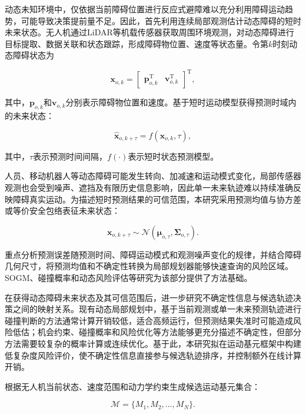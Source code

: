动态未知环境中，仅依据当前障碍位置进行反应式避障难以充分利用障碍运动趋势，可能导致决策提前量不足。因此，首先利用连续局部观测估计动态障碍的短时未来状态。无人机通过LiDAR等机载传感器获取周围环境观测，对动态障碍进行目标提取、数据关联和状态跟踪，形成障碍物位置、速度等状态量。令第$k$时刻动态障碍状态为

\begin{equation}
\mathbf{x}_{o,k}=\begin{bmatrix}\mathbf{p}_{o,k}^{\mathrm T} & \mathbf{v}_{o,k}^{\mathrm T}\end{bmatrix}^{\mathrm T},
\end{equation}

其中，$\mathbf{p}_{o,k}$和$\mathbf{v}_{o,k}$分别表示障碍物位置和速度。基于短时运动模型获得预测时域内的未来状态：

\begin{equation}
\hat{\mathbf{x}}_{o,k+\tau}=f(\mathbf{x}_{o,k},\tau),
\end{equation}

其中，$\tau$表示预测时间间隔，$f(\cdot)$表示短时状态预测模型。

人员、移动机器人等动态障碍可能发生转向、加减速和运动模式变化，局部传感器观测也会受到噪声、遮挡及有限历史信息影响，因此单一未来轨迹难以持续准确反映障碍真实运动。为描述短时预测结果的可信范围，本研究采用预测均值与协方差或等价安全包络表征未来状态：

\begin{equation}
\mathbf{x}_{o,k+\tau}\sim\mathcal{N}\left(\boldsymbol{\mu}_{o,\tau},\boldsymbol{\Sigma}_{o,\tau}\right).
\end{equation}

重点分析预测误差随预测时间、障碍运动模式和观测噪声变化的规律，并结合障碍几何尺寸，将预测均值和不确定性转换为局部规划器能够快速查询的风险区域。SOGM、碰撞概率和动态风险评估等研究为该部分提供了方法基础\cite{thomas2022sogm,thomas2023future,liu2023tight,xia2024risk}。

在获得动态障碍未来状态及其可信范围后，进一步研究不确定性信息与候选轨迹决策之间的映射关系。现有动态局部规划中，基于当前观测或单一未来预测轨迹进行碰撞判断的方法通常计算开销较低，适合高频运行，但预测结果失准时可能造成风险低估；机会约束、碰撞概率和风险优化等方法能够更充分描述不确定性，但部分方法需要较复杂的概率计算或连续优化。基于此，本研究拟在运动基元框架中构建低复杂度风险评价，使不确定性信息直接参与候选轨迹排序，并控制额外在线计算开销。

根据无人机当前状态、速度范围和动力学约束生成候选运动基元集合：

\begin{equation}
\mathcal{M}=\{M_1,M_2,\ldots,M_N\}.
\end{equation}

